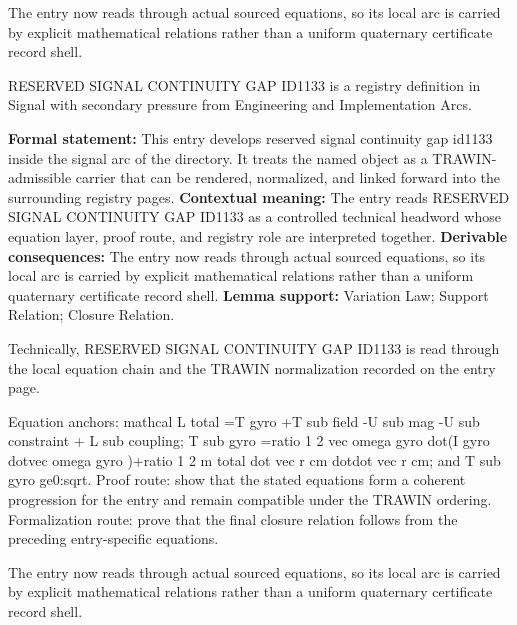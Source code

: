 The entry now reads through actual sourced equations, so its local arc is carried by explicit mathematical relations rather than a uniform quaternary certificate record shell.
\clearpage


\begingroup\small
{}
RESERVED SIGNAL CONTINUITY GAP ID1133 is a registry definition in Signal with secondary pressure from Engineering and Implementation Arcs.

\begingroup\footnotesize\setlength{\emergencystretch}{3em}\sloppy
\textbf{Formal statement:} This entry develops reserved signal continuity gap id1133 inside the signal arc of the directory. It treats the named object as a TRAWIN-admissible carrier that can be rendered, normalized, and linked forward into the surrounding registry pages. \textbf{Contextual meaning:} The entry reads RESERVED SIGNAL CONTINUITY GAP ID1133 as a controlled technical headword whose equation layer, proof route, and registry role are interpreted together. \textbf{Derivable consequences:} The entry now reads through actual sourced equations, so its local arc is carried by explicit mathematical relations rather than a uniform quaternary certificate record shell. \textbf{Lemma support:} Variation Law; Support Relation; Closure Relation.\par
\endgroup

Technically, RESERVED SIGNAL CONTINUITY GAP ID1133 is read through the local equation chain and the TRAWIN normalization recorded on the entry page.

Equation anchors: mathcal L total =T gyro +T sub field -U sub mag -U sub constraint + L sub coupling; T sub gyro =ratio 1 2 vec omega gyro dot(I gyro dotvec omega gyro )+ratio 1 2 m total dot vec r cm dotdot vec r cm; and T sub gyro ge0:sqrt. Proof route: show that the stated equations form a coherent progression for the entry and remain compatible under the TRAWIN ordering. Formalization route: prove that the final closure relation follows from the preceding entry-specific equations.

The entry now reads through actual sourced equations, so its local arc is carried by explicit mathematical relations rather than a uniform quaternary certificate record shell.
\endgroup

